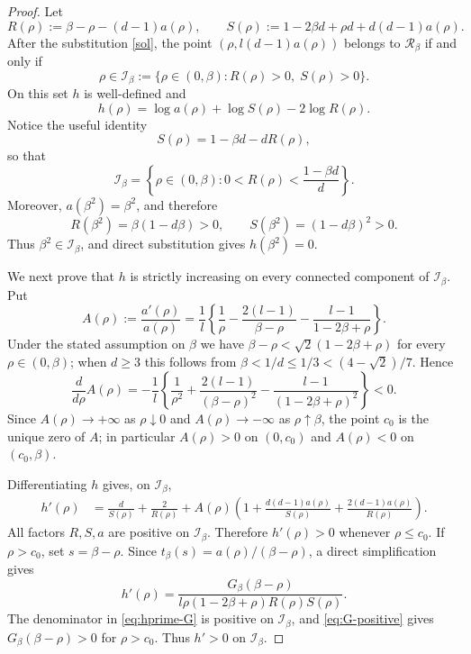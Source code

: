 \documentclass[11pt]{amsart}
\theoremstyle{plain}
\numberwithin{equation}{section}
\numberwithin{theorem}{section}
\numberwithin{figure}{section}
\begin{document}
\begin{proof}
Let
\[
 R(\rho):=\beta-\rho-(d-1)a(\rho),
 \qquad
 S(\rho):=1-2\beta d+\rho d+d(d-1)a(\rho).
\]
After the substitution \eqref{sol}, the point $(\rho,l(d-1)a(\rho))$ belongs to
$\mathcal R_\beta$ if and only if
\begin{equation}
\rho\in\mathcal I_\beta:=\{\rho\in(0,\beta): R(\rho)>0,\; S(\rho)>0\}.
\label{eq:Ibeta}
\end{equation}
On this set $h$ is well-defined and
\[
 h(\rho)=\log a(\rho)+\log S(\rho)-2\log R(\rho).
\]
Notice the useful identity
\begin{equation}
S(\rho)=1-\beta d-dR(\rho),
\label{eq:S-R-identity}
\end{equation}
so that
\[
\mathcal I_\beta=\left\{\rho\in(0,\beta):
0<R(\rho)<\frac{1-\beta d}{d}\right\}.
\]
Moreover, $a(\beta^2)=\beta^2$, and therefore
\[
R(\beta^2)=\beta(1-d\beta)>0,
\qquad
S(\beta^2)=(1-d\beta)^2>0.
\]
Thus $\beta^2\in\mathcal I_\beta$, and direct substitution gives $h(\beta^2)=0$.

We next prove that $h$ is strictly increasing on every connected component of
$\mathcal I_\beta$.  Put
\[
A(\rho):=\frac{a'(\rho)}{a(\rho)}
=\frac1l\left\{\frac1\rho-
\frac{2(l-1)}{\beta-\rho}-\frac{l-1}{1-2\beta+\rho}\right\}.
\]
Under the stated assumption on $\beta$ we have
$\beta-\rho<\sqrt2(1-2\beta+\rho)$ for every $\rho\in(0,\beta)$; when $d\ge3$ this follows
from $\beta<1/d\le1/3<(4-\sqrt2)/7$.  Hence
\[
\frac{d}{d\rho}A(\rho)
=-\frac1l\left\{\frac1{\rho^2}+\frac{2(l-1)}{(\beta-\rho)^2}
-\frac{l-1}{(1-2\beta+\rho)^2}\right\}<0.
\]
Since $A(\rho)\to+\infty$ as $\rho\downarrow0$ and
$A(\rho)\to-\infty$ as $\rho\uparrow\beta$, the point $c_0$ is the unique zero of
$A$; in particular $A(\rho)>0$ on $(0,c_0)$ and $A(\rho)<0$ on $(c_0,\beta)$.

Differentiating $h$ gives, on $\mathcal I_\beta$,
\begin{align*}
 h'(\rho)
&=\frac{d}{S(\rho)}+\frac{2}{R(\rho)}
+A(\rho)\left(1+\frac{d(d-1)a(\rho)}{S(\rho)}
+\frac{2(d-1)a(\rho)}{R(\rho)}\right).
\end{align*}
All factors $R,S,a$ are positive on $\mathcal I_\beta$.  Therefore $h'(\rho)>0$ whenever
$\rho\le c_0$.  If $\rho>c_0$, set $s=\beta-\rho$.  Since
$t_\beta(s)=a(\rho)/(\beta-\rho)$, a direct simplification gives
\begin{equation}
 h'(\rho)=
 \frac{G_\beta(\beta-\rho)}
 {l\rho(1-2\beta+\rho)R(\rho)S(\rho)} .
\label{eq:hprime-G}
\end{equation}
The denominator in \eqref{eq:hprime-G} is positive on $\mathcal I_\beta$, and
\eqref{eq:G-positive} gives $G_\beta(\beta-\rho)>0$ for $\rho>c_0$.  Thus $h'>0$ on
$\mathcal I_\beta$.


\end{proof}
\end{document}

